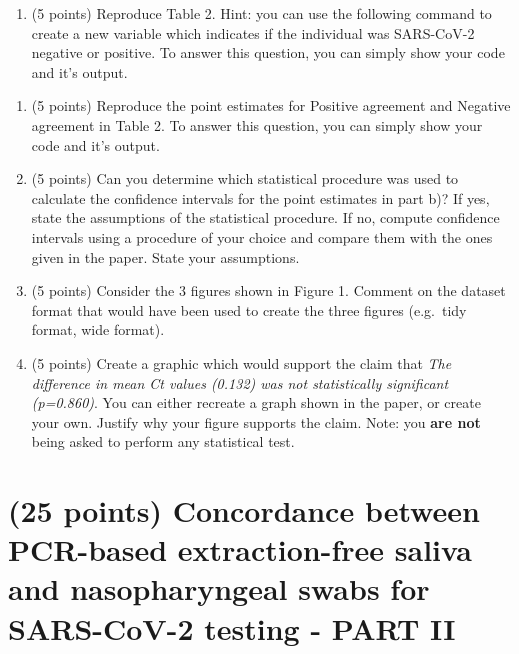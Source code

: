 \documentclass[letterpaper,12pt,twoside,]{pinp}
\providecommand{\tightlist}{%
  \setlength{\itemsep}{0pt}\setlength{\parskip}{0pt}}
\begin{document}
\begin{enumerate}
\def\labelenumi{\alph{enumi})}
\tightlist
\item
  (5 points) Reproduce Table 2. Hint: you can use the following command
  to create a new variable which indicates if the individual was
  SARS-CoV-2 negative or positive. To answer this question, you can
  simply show your code and it's output.
\end{enumerate}

\begin{Shaded}
\begin{Highlighting}[]
\NormalTok{(}\SpecialCharTok{$}\NormalTok{,}\NormalTok{)}
\end{Highlighting}
\end{Shaded}

\begin{enumerate}
\def\labelenumi{\alph{enumi})}
\setcounter{enumi}{1}
\tightlist
\item
  (5 points) Reproduce the point estimates for Positive agreement and
  Negative agreement in Table 2. To answer this question, you can simply
  show your code and it's output.\\
\item
  (5 points) Can you determine which statistical procedure was used to
  calculate the confidence intervals for the point estimates in part b)?
  If yes, state the assumptions of the statistical procedure. If no,
  compute confidence intervals using a procedure of your choice and
  compare them with the ones given in the paper. State your
  assumptions.\\
\item
  (5 points) Consider the 3 figures shown in Figure 1. Comment on the
  dataset format that would have been used to create the three figures
  (e.g.~tidy format, wide format).\\
\item
  (5 points) Create a graphic which would support the claim that
  \emph{The difference in mean Ct values (0.132) was not statistically
  significant (p=0.860)}. You can either recreate a graph shown in the
  paper, or create your own. Justify why your figure supports the claim.
  Note: you \textbf{are not} being asked to perform any statistical
  test.
\end{enumerate}

\hypertarget{points-concordance-between-pcr-based-extraction-free-saliva-and-nasopharyngeal-swabs-for-sars-cov-2-testing---part-ii}{%
\section{(25 points) Concordance between PCR-based extraction-free
saliva and nasopharyngeal swabs for SARS-CoV-2 testing - PART
II}\label{points-concordance-between-pcr-based-extraction-free-saliva-and-nasopharyngeal-swabs-for-sars-cov-2-testing---part-ii}}
\end{document}
